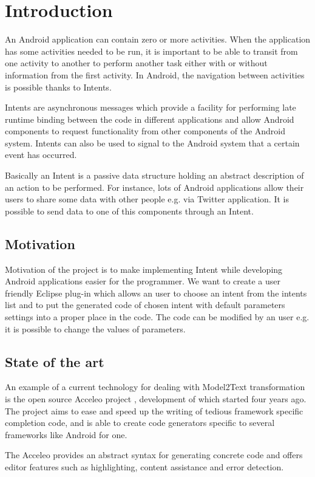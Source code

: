 \section{Introduction}

An Android application can contain zero or more activities. When the application has some activities needed to be run, it is important to be able to transit from one activity to another to perform another task either with or without information from the first activity. In Android, the navigation between activities is possible thanks to Intents.

Intents are asynchronous messages which provide a facility for performing late runtime binding between the code in different applications and allow Android components to request functionality from other components of the Android system. Intents can also be used to signal to the Android system that a certain event has occurred.

Basically an Intent is a passive data structure holding an abstract description of an action to be performed. For instance, lots of Android applications allow their users to share some data with other people e.g. via Twitter application. It is possible to send data to one of this components through an Intent.

\subsection{Motivation}
Motivation of the project is to make implementing Intent while developing Android applications easier for the programmer. We want to create a user friendly Eclipse plug-in which allows an user to choose an intent from the intents list and to put the generated code of chosen intent with default parameters settings into a proper place in the code. The code can be modified by an user e.g. it is possible to change the values of parameters.

\subsection{State of the art}
An example of a current technology for dealing with Model2Text transformation is the open source Acceleo project \cite{acceleo}, development of which started four years ago. The project aims to ease and speed up the writing of tedious framework specific completion code, and is able to create code generators specific to several frameworks like Android for one.

The Acceleo provides an abstract syntax for generating concrete code and offers editor features such as highlighting, content assistance and error detection.

